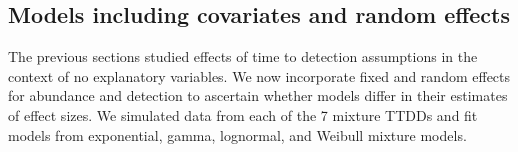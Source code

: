 \documentclass[12pt]{article}
\begin{document}


% 





\subsection{Models including covariates and random effects}\label{sec:simfull}

The previous sections studied effects of time to detection assumptions in the context of no explanatory variables.
We now incorporate fixed and random effects for abundance and detection to ascertain whether models differ in their estimates of effect sizes.
We simulated data from each of the 7 mixture TTDDs and fit models from exponential, gamma, lognormal, and Weibull mixture models.  
\end{document}
